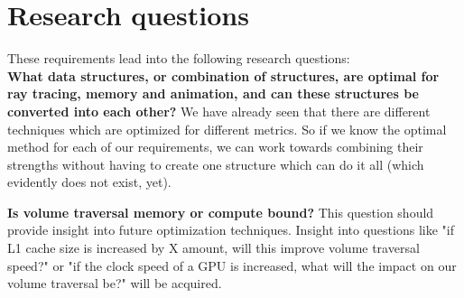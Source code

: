 \section{Research questions}\label{RESEARCHQUESTIONS}

These requirements lead into the following research questions:\\

\noindent\textbf{What data structures, or combination of structures, are optimal for ray tracing, memory and animation, and can these structures be converted into each other?} We have already seen that there are different techniques which are optimized for different metrics. So if we know the optimal method for each of our requirements, we can work towards combining their strengths without having to create one structure which can do it all (which evidently does not exist, yet).

\noindent\textbf{Is volume traversal memory or compute bound?} This question should provide insight into future optimization techniques. Insight into questions like "if L1 cache size is increased by X amount, will this improve volume traversal speed?" or "if the clock speed of a GPU is increased, what will the impact on our volume traversal be?" will be acquired.

